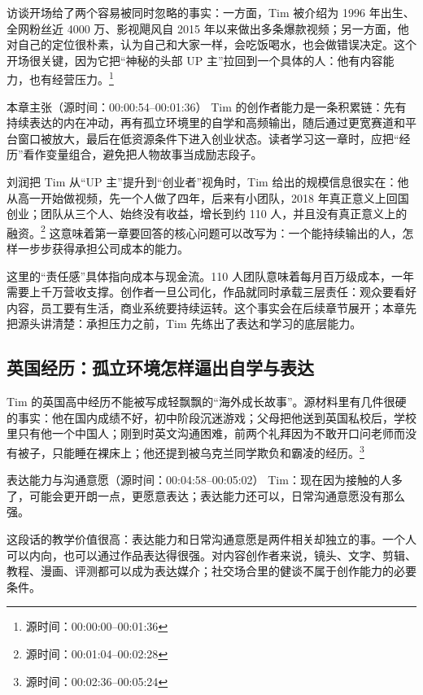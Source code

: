 \documentclass[a4paper]{article}
\begin{document}
访谈开场给了两个容易被同时忽略的事实：一方面，Tim 被介绍为 1996 年出生、全网粉丝近 4000 万、影视飓风自 2015 年以来做出多条爆款视频；另一方面，他对自己的定位很朴素，认为自己和大家一样，会吃饭喝水，也会做错误决定。这个开场很关键，因为它把“神秘的头部 UP 主”拉回到一个具体的人：他有内容能力，也有经营压力。\footnote{源时间：00:00:00--00:01:36}

\begin{importantbox}{本章主张（源时间：00:00:54--00:01:36）}
Tim 的创作者能力是一条积累链：先有持续表达的内在冲动，再有孤立环境里的自学和高频输出，随后通过更宽赛道和平台窗口被放大，最后在低资源条件下进入创业状态。读者学习这一章时，应把“经历”看作变量组合，避免把人物故事当成励志段子。
\end{importantbox}

刘润把 Tim 从“UP 主”提升到“创业者”视角时，Tim 给出的规模信息很实在：他从高一开始做视频，先一个人做了四年，后来有小团队，2018 年真正意义上回国创业；团队从三个人、始终没有收益，增长到约 110 人，并且没有真正意义上的融资。\footnote{源时间：00:01:04--00:02:28} 这意味着第一章要回答的核心问题可以改写为：一个能持续输出的人，怎样一步步获得承担公司成本的能力。

这里的“责任感”具体指向成本与现金流。110 人团队意味着每月百万级成本，一年需要上千万营收支撑。创作者一旦公司化，作品就同时承载三层责任：观众要看好内容，员工要有生活，商业系统要持续运转。这个事实会在后续章节展开；本章先把源头讲清楚：承担压力之前，Tim 先练出了表达和学习的底层能力。

\subsection{英国经历：孤立环境怎样逼出自学与表达}

Tim 的英国高中经历不能被写成轻飘飘的“海外成长故事”。源材料里有几件很硬的事实：他在国内成绩不好，初中阶段沉迷游戏；父母把他送到英国私校后，学校里只有他一个中国人；刚到时英文沟通困难，前两个礼拜因为不敢开口问老师而没有被子，只能睡在裸床上；他还提到被乌克兰同学欺负和霸凌的经历。\footnote{源时间：00:02:36--00:05:24}

\begin{dialoguebox}{表达能力与沟通意愿（源时间：00:04:58--00:05:02）}
Tim：现在因为接触的人多了，可能会更开朗一点，更愿意表达；表达能力还可以，日常沟通意愿没有那么强。
\end{dialoguebox}

这段话的教学价值很高：表达能力和日常沟通意愿是两件相关却独立的事。一个人可以内向，也可以通过作品表达得很强。对内容创作者来说，镜头、文字、剪辑、教程、漫画、评测都可以成为表达媒介；社交场合里的健谈不属于创作能力的必要条件。
\end{document}
